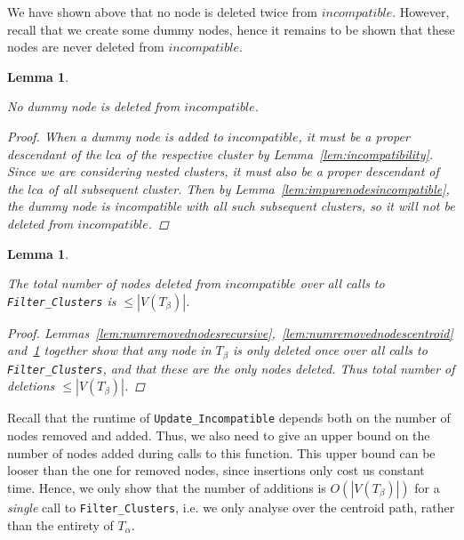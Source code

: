 \documentclass[12pt,a4paper]{article}
\newcommand{\TA}{T_\alpha}
\newcommand{\TB}{T_\beta}
\newtheorem{numremovednodesdummy}[incompatibility]{Lemma}
\newtheorem{numremovednodes}[incompatibility]{Lemma}
\begin{document}
    We have shown above that no node is deleted twice from $incompatible$. However, recall that we create some dummy nodes, hence it remains to be shown that these nodes are never deleted from $incompatible$.
    \newline

    \begin{numremovednodesdummy}
        \label{lem:numremovednodesdummy}

        No dummy node is deleted from $incompatible$.

        \begin{proof}
            When a dummy node is added to $incompatible$, it must be a proper descendant of the $lca$ of the respective cluster by Lemma~\ref{lem:incompatibility}. Since we are considering nested clusters, it must also be a proper descendant of the $lca$ of all subsequent cluster. Then by Lemma~\ref{lem:impurenodesincompatible}, the dummy node is incompatible with all such subsequent clusters, so it will not be deleted from $incompatible$.
        \end{proof}
    \end{numremovednodesdummy}

    \medskip
    \begin{numremovednodes}
        \label{lem:numremovednodes}

        The total number of nodes deleted from $incompatible$ over all calls to \texttt{Filter\_Clusters} is $\leq |V(\TB)|$.

        \begin{proof}
            Lemmas~\ref{lem:numremovednodesrecursive},~\ref{lem:numremovednodescentroid} and~\ref{lem:numremovednodesdummy} together show that any node in $\TB$ is only deleted once over all calls to \texttt{Filter\_Clusters}, and that these are the only nodes deleted. Thus total number of deletions $\leq |V(\TB)|$.
        \end{proof}
    \end{numremovednodes}

    Recall that the runtime of \texttt{Update\_Incompatible} depends both on the number of nodes removed and added. Thus, we also need to give an upper bound on the number of nodes added during calls to this function. This upper bound can be looser than the one for removed nodes, since insertions only cost us constant time. Hence, we only show that the number of additions is $O(|V(\TB)|)$ for a \textit{single} call to \texttt{Filter\_Clusters}, i.e. we only analyse over the centroid path, rather than the entirety of $\TA$.
    \newline
\end{document}
